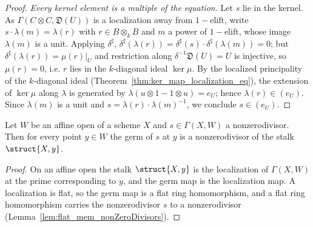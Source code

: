 \begin{proof}
  \emph{Every kernel element is a multiple of the equation.} Let \(s\) lie in the kernel. As
  \(\Gamma(C \otimes C, \mathfrak D(U))\) is a localization away from \(1 - \mathrm{elift}\), write
  \(s \cdot \lambda(m) = \lambda(r)\) with \(r \in B \otimes_k B\) and \(m\) a power of
  \(1 - \mathrm{elift}\), whose image \(\lambda(m)\) is a unit. Applying \(\delta^\sharp\),
  \(\delta^\sharp(\lambda(r)) = \delta^\sharp(s) \cdot \delta^\sharp(\lambda(m)) = 0\); but
  \(\delta^\sharp(\lambda(r)) = \mu(r)\big|_{U}\) and restriction along
  \(\delta^{-1}\mathfrak D(U) = U\) is injective, so \(\mu(r) = 0\), i.e. \(r\) lies in the
  \(k\)-diagonal ideal \(\ker \mu\). By the localized principality of the \(k\)-diagonal ideal
  (Theorem~\ref{thm:ker_map_localization_eq}), the extension of \(\ker \mu\) along \(\lambda\) is
  generated by \(\lambda(u \otimes 1 - 1 \otimes u) = e_U\); hence \(\lambda(r) \in (e_U)\). Since
  \(\lambda(m)\) is a unit and \(s = \lambda(r) \cdot \lambda(m)^{-1}\), we conclude \(s \in (e_U)\).
\end{proof}

\begin{lemma}
  \label{lem:affineOpen_germ_mem_nonZeroDivisors}
  \leanok
  Let \(W\) be an affine open of a scheme \(X\) and \(s \in \Gamma(X, W)\) a nonzerodivisor. Then
  for every point \(y \in W\) the germ of \(s\) at \(y\) is a nonzerodivisor of the stalk
  \(\struct{X, y}\).
\end{lemma}
\begin{proof}
  \leanok
  On an affine open the stalk \(\struct{X, y}\) is the localization of \(\Gamma(X, W)\) at the
  prime corresponding to \(y\), and the germ map is the localization map. A localization is flat,
  so the germ map is a flat ring homomorphism, and a flat ring homomorphism carries the
  nonzerodivisor \(s\) to a nonzerodivisor (Lemma~\ref{lem:flat_mem_nonZeroDivisors}).
\end{proof}

